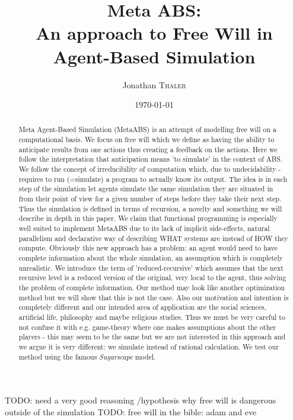 \documentclass{article}
\title{Meta ABS: \\ An approach to Free Will in Agent-Based Simulation} %
\author{Jonathan \textsc{Thaler}} %
\date{\today} %
\begin{document}
\maketitle %

\begin{abstract}
Meta Agent-Based Simulation (MetaABS) is an attempt of modelling free will on a computational basis. We focus on free will which we define as having the ability to anticipate results from one actions thus creating a feedback on the actions. Here we follow the interpretation that anticipation means 'to simulate' in the context of ABS. We follow the concept of irreducibility of computation which, due to undecidability - requires to run (=simulate) a program to actually know its output. The idea is in each step of the simulation let agents simulate the same simulation they are situated in from their point of view for a given number of steps before they take their next step. Thus the simulation is defined in terms of recursion, a novelty and something we will describe in depth in this paper. We claim that functional programming is especially well suited to implement MetaABS due to its lack of implicit side-effects, natural parallelism and declarative way of describing WHAT systems are instead of HOW they compute. Obviously this new approach has a problem: an agent would need to have complete information about the whole simulation, an assumption which is completely unrealistic. We introduce the term of 'reduced-recursive' which assumes that the next recursive level is a reduced version of the original, very local to the agent, thus solving the problem of complete information.
Our method may look like another optimization method but we will show that this is not the case. Also our motivation and intention is completely different and our intended area of application are the social sciences, artificial life, philosophy and maybe religious studies. Thus we must be very careful to not confuse it with e.g. game-theory where one makes assumptions about the other players - this may seem to be the same but we are not interested in this approach and we argue it is very different: we simulate instead of rational calculation. We test our method using the famous \textit{Sugarscape} model.
\end{abstract}

TODO:  need a very good reasoning /hypothesis why free will is dangerous outside of the simulation
TODO: free will in the bible: adam and eve
\end{document}
